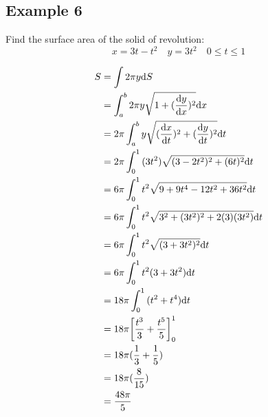 \documentclass[letterpaper, 12pt]{math}
\begin{document}
\subsection*{Example 6}
Find the surface area of the solid of revolution:
\[ x = 3t-t^{2} \quad y = 3t^{2} \quad 0 \leq t \leq 1 \]
\begin{center}
\end{center}
\begin{align*}
  S &= \int{2\pi y\mathrm{d}{S}} \\
  &= \int_{a}^{b}{2\pi y\sqrt{1+(\frac{\mathrm{d}{y}}{\mathrm{d}{x}})^{2}}\mathrm{d}{x}} \\
  &= 2\pi\int_{a}^{b}{y\sqrt{(\frac{\mathrm{d}{x}}{\mathrm{d}{t}})^{2}+
    (\frac{\mathrm{d}{y}}{\mathrm{d}{t}})^{2}}\mathrm{d}{t}} \\
  &= 2\pi\int_{0}^{1}{(3t^{2})\sqrt{(3-2t^{2})^{2}+(6t)^{2}}\mathrm{d}{t}} \\
  &= 6\pi\int_{0}^{1}{t^{2}\sqrt{9+9t^{4}-12t^{2}+36t^{2}}\mathrm{d}{t}} \\
  &= 6\pi\int_{0}^{1}{t^{2}\sqrt{3^{2}+(3t^{2})^{2}+2(3)(3t^{2})}\mathrm{d}{t}} \\
  &= 6\pi\int_{0}^{1}{t^{2}\sqrt{(3+3t^{2})^{2}}\mathrm{d}{t}} \\
  &= 6\pi\int_{0}^{1}{t^{2}(3+3t^{2})\mathrm{d}{t}} \\
  &= 18\pi\int_{0}^{1}{(t^{2}+t^{4})\mathrm{d}{t}} \\
  &= 18\pi\bigg[\frac{t^{3}}{3}+\frac{t^{5}}{5}\bigg]_{0}^{1} \\
  &= 18\pi(\frac{1}{3}+\frac{1}{5}) \\
  &= 18\pi(\frac{8}{15}) \\
  &= \frac{48\pi}{5}
\end{align*}
\end{document}
